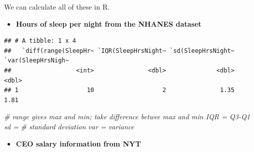 \documentclass[
]{book}
\newenvironment{Shaded}{\begin{snugshade}}{\end{snugshade}}
\newcommand{\CommentTok}[1]{\textcolor[rgb]{0.56,0.35,0.01}{\textit{#1}}}
\newcommand{\DataTypeTok}[1]{\textcolor[rgb]{0.13,0.29,0.53}{#1}}
\newcommand{\KeywordTok}[1]{\textcolor[rgb]{0.13,0.29,0.53}{\textbf{#1}}}
\newcommand{\NormalTok}[1]{#1}
\newcommand{\OperatorTok}[1]{\textcolor[rgb]{0.81,0.36,0.00}{\textbf{#1}}}
\newcommand{\OtherTok}[1]{\textcolor[rgb]{0.56,0.35,0.01}{#1}}
\newcommand{\StringTok}[1]{\textcolor[rgb]{0.31,0.60,0.02}{#1}}
\providecommand{\tightlist}{%
  \setlength{\itemsep}{0pt}\setlength{\parskip}{0pt}}
\begin{document}
We can calculate all of these in R.

\begin{itemize}
\tightlist
\item
  \textbf{Hours of sleep per night from the NHANES dataset}
\end{itemize}

\begin{Shaded}
\end{Shaded}

\begin{verbatim}
## # A tibble: 1 x 4
##   `diff(range(SleepHr~ `IQR(SleepHrsNight~ `sd(SleepHrsNight~ `var(SleepHrsNigh~
##                  <int>               <dbl>              <dbl>              <dbl>
## 1                   10                   2               1.35               1.81
\end{verbatim}

\begin{Shaded}
\begin{Highlighting}[]
\CommentTok{# range gives max and min; take difference betwee max and min IQR = Q3-Q1 sd =}
\CommentTok{# standard deviation var = variance}
\end{Highlighting}
\end{Shaded}

\begin{itemize}
\tightlist
\item
  \textbf{CEO salary information from NYT}
\end{itemize}

\begin{Shaded}
\end{Shaded}
\end{document}

